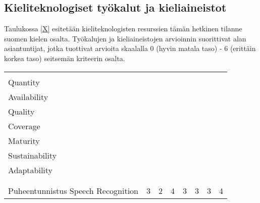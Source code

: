 \documentclass[]{../../metanetpaper}
\begin{document}
\begin{multicols}{2}
\subsection{Kieliteknologiset työkalut ja kieliaineistot}


Taulukossa \ref{X} esitetään kieliteknologisten resurssien
tämän hetkinen tilanne suomen kielen osalta. Työkalujen ja
kieliaineistojen arvioinnin suorittivat alan asiantuntijat, jotka
tuottivat arvioita skaalalla 0 (hyvin matala taso) - 6 (erittäin
korkea taso) seitsemän kriteerin osalta.



 \begin{table}
 \centering
 \begin{tabular}{>{\columncolor[RGB]{255,190,000}}p{.33\linewidth}ccccccc}
 \toprule
 \rowcolor[RGB]{255,190,000}
  \cellcolor{white}&\begin{sideways}\makecell[l]{Määrä \\
Quantity}\end{sideways}
 &\begin{sideways}\makecell[l]{\makecell[l]{Saatavuus \\ Availability}
}\end{sideways} &\begin{sideways}\makecell[l]{Laatu \\ Quality}\end{sideways}
 &\begin{sideways}\makecell[l]{Kattavuus \\ Coverage}\end{sideways}
&\begin{sideways}\makecell[l]{Valmiusaste \\ Maturity}\end{sideways}
&\begin{sideways}\makecell[l]{Vakaus \\ Sustainability}\end{sideways}
&\begin{sideways}\makecell[l]{Soveltuvuus \\ Adaptability}\end{sideways} \\
 \midrule
 \multicolumn{8}{>{\columncolor[RGB]{255,155,000}}l}{Kieliteknologia:
työkalut, teknologiat ja sovellukset} \\\addlinespace[{-.009cm}]
 \multicolumn{8}{>{\columncolor[RGB]{255,155,000}}l}{Language Technology: Tools,
Technologies and Applications} \\
 \midrule
 Puheentunnistus \newline Speech Recognition & 3 & 2 & 4 & 3 & 3 & 3 & 4 \\

\end{tabular}
\end{table}
\end{multicols}
\end{document}
